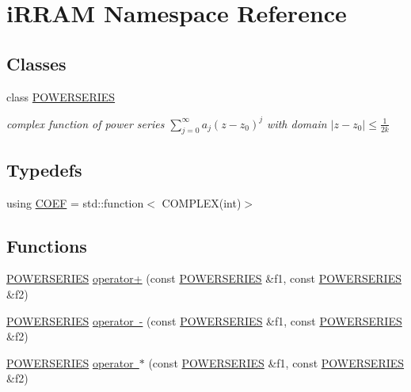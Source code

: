 \hypertarget{namespacei_r_r_a_m}{}\section{i\+R\+R\+AM Namespace Reference}
\label{namespacei_r_r_a_m}
\subsection*{Classes}
\begin{DoxyCompactItemize}
\item 
class \mbox{\hyperlink{classi_r_r_a_m_1_1_p_o_w_e_r_s_e_r_i_e_s}{P\+O\+W\+E\+R\+S\+E\+R\+I\+ES}}
\begin{DoxyCompactList}\small\item\em complex function of power series $ \displaystyle\sum_{j=0}^{\infty}{a_j (z - z_0)^j} $ with domain $ |z - z_0| \leq \frac{1}{2k}$ \end{DoxyCompactList}\end{DoxyCompactItemize}
\subsection*{Typedefs}
\begin{DoxyCompactItemize}
\item 
using \mbox{\hyperlink{namespacei_r_r_a_m_a7fb438d61c85aface41ae108812df36f}{C\+O\+EF}} = std\+::function$<$ C\+O\+M\+P\+L\+EX(int)$>$
\end{DoxyCompactItemize}
\subsection*{Functions}
\begin{DoxyCompactItemize}
\item 
\mbox{\hyperlink{classi_r_r_a_m_1_1_p_o_w_e_r_s_e_r_i_e_s}{P\+O\+W\+E\+R\+S\+E\+R\+I\+ES}} \mbox{\hyperlink{namespacei_r_r_a_m_a8b1db00c78d93c9f6cc4f98c83e875ec}{operator+}} (const \mbox{\hyperlink{classi_r_r_a_m_1_1_p_o_w_e_r_s_e_r_i_e_s}{P\+O\+W\+E\+R\+S\+E\+R\+I\+ES}} \&f1, const \mbox{\hyperlink{classi_r_r_a_m_1_1_p_o_w_e_r_s_e_r_i_e_s}{P\+O\+W\+E\+R\+S\+E\+R\+I\+ES}} \&f2)
\item 
\mbox{\hyperlink{classi_r_r_a_m_1_1_p_o_w_e_r_s_e_r_i_e_s}{P\+O\+W\+E\+R\+S\+E\+R\+I\+ES}} \mbox{\hyperlink{namespacei_r_r_a_m_af0eecbd8cf0f60423fe94a4a6c442837}{operator -\/}} (const \mbox{\hyperlink{classi_r_r_a_m_1_1_p_o_w_e_r_s_e_r_i_e_s}{P\+O\+W\+E\+R\+S\+E\+R\+I\+ES}} \&f1, const \mbox{\hyperlink{classi_r_r_a_m_1_1_p_o_w_e_r_s_e_r_i_e_s}{P\+O\+W\+E\+R\+S\+E\+R\+I\+ES}} \&f2)
\item 
\mbox{\hyperlink{classi_r_r_a_m_1_1_p_o_w_e_r_s_e_r_i_e_s}{P\+O\+W\+E\+R\+S\+E\+R\+I\+ES}} \mbox{\hyperlink{namespacei_r_r_a_m_a26a16dd1e1f58b33a07c80c72fb3664a}{operator $\ast$}} (const \mbox{\hyperlink{classi_r_r_a_m_1_1_p_o_w_e_r_s_e_r_i_e_s}{P\+O\+W\+E\+R\+S\+E\+R\+I\+ES}} \&f1, const \mbox{\hyperlink{classi_r_r_a_m_1_1_p_o_w_e_r_s_e_r_i_e_s}{P\+O\+W\+E\+R\+S\+E\+R\+I\+ES}} \&f2)
\end{DoxyCompactItemize}


